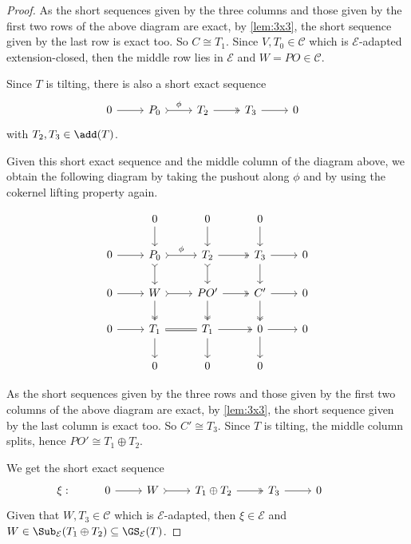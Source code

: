 \begin{proof}
As the short sequences given by the three columns and those given by the first two rows of the above diagram are exact, by \cref{lem:3x3}, the short sequence given by the last row is exact too. So $C \cong T_1$. Since $V,T_0 \in \mathscr{C}$ which is $\mathcal{E}$-adapted extension-closed, then the middle row lies in $\mathcal{E}$ and $W = PO \in \mathscr{C}$.

Since $T$ is tilting, there is also a short exact sequence 
\[\begin{tikzcd}
     & 0 & P_0 & T_2 & T_3 &  0 & 
	\arrow[from=1-2, to=1-3]
	\arrow[tail,"\phi", from=1-3, to=1-4]
	\arrow[two heads,from=1-4, to=1-5]
	\arrow[from=1-5, to=1-6]
\end{tikzcd}\] with $T_2,T_3 \in \add(T)$.


Given this short exact sequence and the middle column of the diagram above, we obtain the following diagram by taking the pushout along $\phi$ and by using the cokernel lifting property again.

\[\begin{tikzcd}
         & 0 & 0 & 0 &  \\
	0 & P_0 & T_2  & T_3 &  0 \\
     0 & W & PO' & C' & 0 \\
      0 & T_1 & T_1 & 0 & 0 \\
       & 0 & 0 & 0 & 
	\arrow[from=2-1, to=2-2]
	\arrow[tail,"\phi", from=2-2, to=2-3]
	\arrow[two heads,from=2-3, to=2-4]
	\arrow[from=2-4, to=2-5]
        \arrow[from=3-1, to=3-2]
	\arrow[tail, from=3-2, to=3-3]
	\arrow[two heads,from=3-3, to=3-4]
	\arrow[from=3-4, to=3-5]
        \arrow[from=4-1, to=4-2]
	\arrow[equals, from=4-2, to=4-3]
	\arrow[two heads,from=4-3, to=4-4]
	\arrow[from=4-4, to=4-5]
        \arrow[from=4-2, to=5-2]
	\arrow[two heads, from=3-2, to=4-2]
	\arrow[tail,from=2-2, to=3-2]
	\arrow[from=1-2, to=2-2]
        \arrow[from=4-3, to=5-3]
	\arrow[two heads, from=3-3, to=4-3]
	\arrow[tail,from=2-3, to=3-3]
	\arrow[from=1-3, to=2-3]
        \arrow[from=4-4, to=5-4]
	\arrow[two heads, from=3-4, to=4-4]
	\arrow[from=2-4, to=3-4]
	\arrow[from=1-4, to=2-4]
\end{tikzcd} \]


As the short sequences given by the three rows and those given by the first two columns of the above diagram are exact, by \cref{lem:3x3}, the short sequence given by the last column is exact too. So $C' \cong T_3$. Since $T$ is tilting, the middle column splits, hence $PO' \cong T_1 \oplus T_2$.


We get the short exact sequence 
\[\begin{tikzcd}
    \xi: & 0 & W & T_1 \oplus T_2 & T_3 &  0 & 
	\arrow[from=1-2, to=1-3]
	\arrow[tail, from=1-3, to=1-4]
	\arrow[two heads,from=1-4, to=1-5]
	\arrow[from=1-5, to=1-6]
\end{tikzcd}\]
Given that $W,T_3 \in \mathscr{C}$ which is $\mathcal{E}$-adapted, then $\xi \in \mathcal{E}$ and $W \in \Sub_\mathcal{E}(T_1 \oplus T_2) \subseteq \GS_\mathcal{E}(T)$.


\end{proof}

